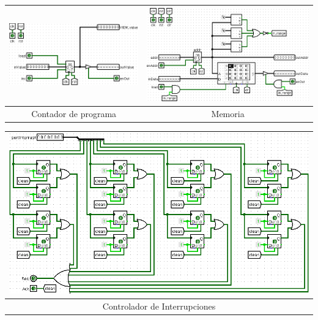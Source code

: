 \documentclass[a4paper,11pt]{article}
\begin{document}

\begin{center}
\begin{tabular}[t]{c|c}
\includegraphics[scale=0.3]{img/2_PC.png} & \includegraphics[scale=0.3]{img/4_Memory.png}\\
\hline
Contador de programa & Memoria\\ \hline
\end{tabular}
\end{center}


\begin{center}
\begin{tabular}[t]{c}
\includegraphics[scale=0.3]{img/7_InterruptControl.png}\\
\hline
Controlador de Interrupciones\\ \hline
\end{tabular}
\end{center}
\end{document}
